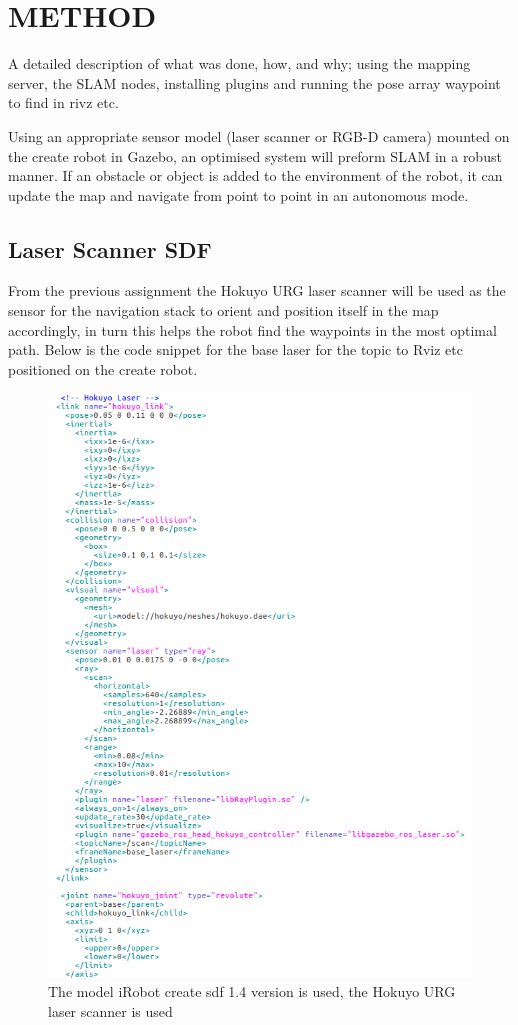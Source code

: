 \documentclass[a4paper, 10pt]{IEEEconf}
\begin{document}
\clearpage
\section{METHOD}
A detailed description of what was done, how, and why; using the mapping server, the SLAM nodes, installing plugins and running the pose array waypoint to find in rivz etc.

Using an appropriate sensor model (laser scanner or RGB-D camera) mounted on the create robot in Gazebo, an optimised system will preform SLAM in a robust manner. If an obstacle or object is added to the environment of the robot, it can update the map and navigate from point to point in an autonomous mode. 


\subsection{Laser Scanner SDF}
 

From the previous assignment the Hokuyo URG laser scanner will be used as the sensor for the navigation stack to orient and position itself in the map accordingly, in turn this helps the robot find the waypoints in the most optimal path. Below is the code snippet for the base laser for the topic to Rviz etc positioned on the create robot.

\begin{figure}[H]
  \includegraphics[width=0.7\linewidth, center]{images/laser}
  \caption{The model iRobot create sdf 1.4 version is used, the Hokuyo URG laser scanner is used}
  \label{fig:The model iRobot create sdf 1.4 version is used, the Hokuyo URG laser scanner is used}
\end{figure}
\end{document}
